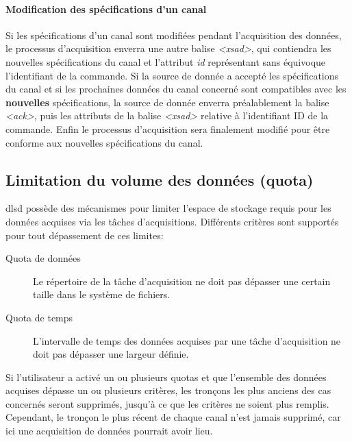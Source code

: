 \documentclass[a4paper,12pt,BCOR6mm,bibtotoc,idxtotoc]{scrbook}
\begin{document}
\paragraph{Modification des sp\'ecifications d'un canal}
Si les sp\'ecifications d'un canal sont modifi\'ees pendant
l'acquisition des donn\'ees, le processus d'acquisition enverra une
autre balise \textit{\textless xsad\textgreater}, qui contiendra les
nouvelles sp\'ecifications du canal et l'attribut \textit{id}
repr\'esentant sans \'equivoque l'identifiant de la commande. Si la
source de donn\'ee a accept\'e les sp\'ecifications du canal et si les
prochaines donn\'ees du canal concern\'e sont compatibles avec les
\textbf{nouvelles} sp\'ecifications, la source de donn\'ee enverra
pr\'ealablement la balise \textit{\textless ack\textgreater}, puis les
attributs de la balise \textit{\textless xsad\textgreater} relative
\`a l'identifiant ID de la commande.
Enfin le processus d'acquisition sera finalement modifi\'e
pour \^etre conforme aux nouvelles sp\'ecifications du canal.


\subsection{Limitation du volume des donn\'ees (quota)}
\label{sec:dlsd_logger_quota}

dlsd poss\`ede des m\'ecanismes pour limiter l'espace de stockage
requis pour les donn\'ees acquises via les t\^aches d'acquisitions.
Diff\'erents crit\`eres sont support\'es pour tout d\'epassement de
ces limites:

\begin{description}

\item[Quota de donn\'ees] Le r\'epertoire de la t\^ache d'acquisition
  ne doit pas d\'epasser une certain taille dans le syst\`eme de
  fichiers.

\item[Quota de temps] L'intervalle de temps des donn\'ees acquises par
  une t\^ache d'acquisition ne doit pas d\'epasser une largeur
  d\'efinie.

\end{description}

Si l'utilisateur a activ\'e un ou plusieurs quotas et que l'ensemble des donn\'ees
acquises d\'epasse un ou plusieurs crit\`eres, les tron\c cons
les plus anciens des cas concern\'es seront supprim\'es, jusqu'\`a ce que les
crit\`eres ne soient plus remplis.
Cependant, le tron\c con le plus r\'ecent de chaque canal n'est jamais supprim\'e,
car ici une acquisition de donn\'ees pourrait avoir lieu.
\end{document}
